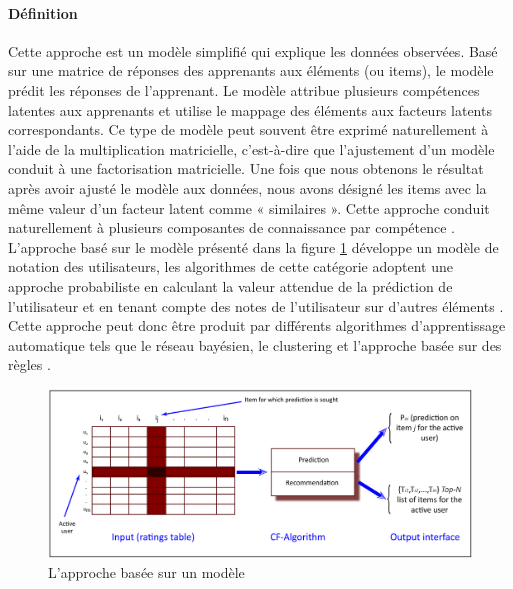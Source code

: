 \paragraph{Définition \\}
Cette approche est un modèle simplifié qui explique les données observées. Basé sur une matrice de réponses des apprenants aux éléments (ou items), le modèle prédit les réponses de l’apprenant. Le modèle attribue plusieurs compétences latentes aux apprenants et utilise le mappage des éléments aux facteurs latents correspondants. Ce type de modèle peut souvent être exprimé naturellement à l’aide de la multiplication matricielle, c’est-à-dire que l’ajustement d’un modèle conduit à une factorisation matricielle. Une fois que nous obtenons le résultat après avoir ajusté le modèle aux données, nous avons désigné les items avec la même valeur d’un facteur latent comme « similaires ». Cette approche conduit naturellement à plusieurs composantes de connaissance par compétence \cite{pelanek2018measuring}. L’approche basé sur le modèle présenté dans la figure \ref{model_based} développe un modèle de notation des utilisateurs, les algorithmes de cette catégorie adoptent une approche probabiliste en calculant la valeur attendue de la prédiction de l’utilisateur et en tenant compte des notes de l’utilisateur sur d’autres éléments \cite{item_based_recommendation_algo}. \\
Cette approche peut donc être produit par différents algorithmes d’apprentissage automatique tels que le réseau bayésien, le clustering et l’approche basée sur des règles \cite{breese2013empirical}.

\begin{figure}[H]
	\begin{center}
		\includegraphics[width=\textwidth]{images/chapitre3/Model_based.png}
	\end{center}
\caption{L’approche basée sur un modèle}
\label{model_based}
\end{figure}

